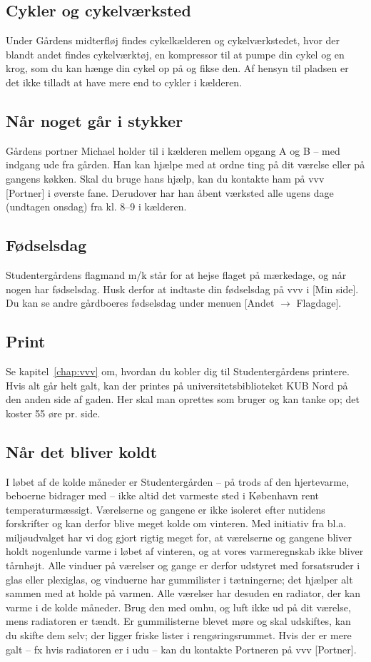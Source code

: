 \documentclass[11pt,article,twoside,openany,danish,extrafontsizes]{memoir} %
\begin{document}
\subsection{Cykler og cykelværksted}
Under Gårdens midterfløj findes cykelkælderen og cykelværkstedet, hvor der blandt andet findes cykelværktøj, en kompressor til at pumpe din cykel og en krog, som du kan hænge din cykel op på og fikse den. Af hensyn til pladsen er det ikke tilladt at have mere end to cykler i kælderen.

\subsection{Når noget går i stykker}
Gårdens portner Michael holder til i kælderen mellem opgang A og B -- med indgang ude fra gården. Han kan hjælpe med at ordne ting på dit værelse eller på gangens køkken. Skal du bruge hans hjælp, kan du kontakte ham på vvv [Portner] i øverste fane. Derudover har han åbent værksted alle ugens dage (undtagen onsdag) fra kl. 8--9 i kælderen.

\subsection{Fødselsdag}
Studentergårdens flagmand m/k står for at hejse flaget på mærkedage, og når nogen har fødselsdag. Husk derfor at indtaste din fødselsdag på vvv i [Min side]. Du kan se andre gårdboeres fødselsdag under menuen [Andet $\rightarrow$ Flagdage].

\subsection{Print}
Se kapitel~\ref{chap:vvv} om, hvordan du kobler dig til Studentergårdens printere. Hvis alt går helt galt, kan der printes på universitetsbiblioteket KUB Nord på den anden side af gaden. Her skal man oprettes som bruger og kan tanke op; det koster 55 øre pr. side.

\subsection{Når det bliver koldt}
I løbet af de kolde måneder er Studentergården -- på trods af den hjertevarme, beboerne bidrager med -- ikke altid det varmeste sted i København rent temperaturmæssigt. Værelserne og gangene er ikke isoleret efter nutidens forskrifter og kan derfor blive meget kolde om vinteren. Med initiativ fra bl.a. miljøudvalget har vi dog gjort rigtig meget for, at værelserne og gangene bliver holdt nogenlunde varme i løbet af vinteren, og at vores varmeregnskab ikke bliver tårnhøjt. Alle vinduer på værelser og gange er derfor udstyret med forsatsruder i glas eller plexiglas, og vinduerne har gummilister i tætningerne; det hjælper alt sammen med at holde på varmen. Alle værelser har desuden en radiator, der kan varme i de kolde måneder. Brug den med omhu, og luft ikke ud på dit værelse, mens radiatoren er tændt. Er gummilisterne blevet møre og skal udskiftes, kan du skifte dem selv; der ligger friske lister i rengøringsrummet. Hvis der er mere galt -- fx hvis radiatoren er i udu -- kan du kontakte Portneren på vvv [Portner].
\end{document}
